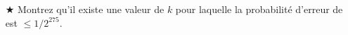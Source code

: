 \documentclass{article}
\newcommand{\avance}{{\large$\bigstar$}}         %
\newcommand{\avancepts}{{\scriptsize$\bigstar$}} %
\newcommand{\algskip}{\vspace{3pt}}              %
\begin{document}
\begin{question}
\begin{enumerate}[(a)]
\begin{minipage}[t]{0.9575\textwidth}
{\begin{algorithm}[H]
        
        \algskip
        
      \end{algorithm}
    }
    \end{minipage}

    \vspace*{80pt}
    
  \item[\avance{}] Montrez \marginpar{\avancepts{} \addbonus{2.5}} qu'il
    existe une valeur de $k$ pour laquelle la probabilité d'erreur de
    \pseudomed est $\leq 1 / 2^{275}$.
    
  \end{enumerate}
\end{question}
\end{document}
